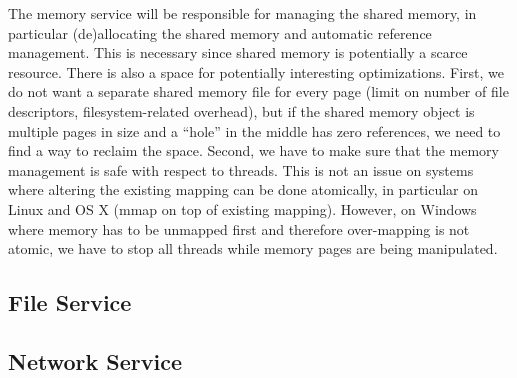 The memory service will be responsible for managing the shared memory,
in particular (de)allocating the shared memory and automatic reference
management. This is necessary since shared memory is potentially a
scarce resource. There is also a space for potentially interesting
optimizations. First, we do not want a separate shared memory file for
every page (\eg limit on number of file descriptors, filesystem-related
overhead), but if the shared memory object is multiple pages in size and
a ``hole'' in the middle has zero references, we need to find a way to
reclaim the space. Second, we have to make sure that the memory
management is safe with respect to threads. This is not an issue on
systems where altering the existing mapping can be done atomically, in
particular on Linux and OS X (\ie mmap on top of existing mapping).
However, on Windows where memory has to be unmapped first and therefore
over-mapping is not atomic, we have to stop all threads while memory
pages are being manipulated.



\subsection{File Service}
\label{sub:file_service}

\subsection{Network Service}
\label{sub:network_service}
